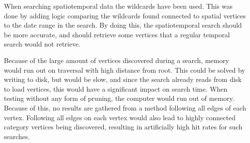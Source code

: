 When searching spatiotemporal data the wildcards have been used. This was done by adding logic comparing the wildcards found connected to spatial vertices to the date range in the search. By doing this, the spatiotemporal search should be more accurate, and should retrieve some vertices that a regular temporal search would not retrieve.

Because of the large amount of vertices discovered during a search, memory would run out on traversal with high distance from root. This could be solved by writing to disk, but would be slow, and since the search already reads from disk to load vertices, this would have a significant impact on search time. When testing without any form of pruning, the computer would run out of memory. Because of this, no results are gathered from a method following all edges of each vertex. Following all edges on each vertex would also lead to highly connected category vertices being discovered, resulting in artificially high hit rates for such searches.